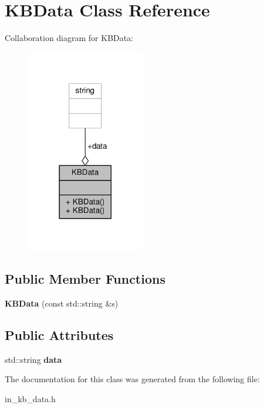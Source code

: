 \hypertarget{classKBData}{}\section{K\+B\+Data Class Reference}
\label{classKBData}


Collaboration diagram for K\+B\+Data\+:
\nopagebreak
\begin{figure}[H]
\begin{center}
\leavevmode
\includegraphics[width=146pt]{d0/d9b/classKBData__coll__graph}
\end{center}
\end{figure}
\subsection*{Public Member Functions}
\begin{DoxyCompactItemize}
\item 
{\bfseries K\+B\+Data} (const std\+::string \&s)\hypertarget{classKBData_a14da020cad9340edf700e625429fb486}{}\label{classKBData_a14da020cad9340edf700e625429fb486}

\end{DoxyCompactItemize}
\subsection*{Public Attributes}
\begin{DoxyCompactItemize}
\item 
std\+::string {\bfseries data}\hypertarget{classKBData_a82f038f48b7bd35567e744ca8ab34fad}{}\label{classKBData_a82f038f48b7bd35567e744ca8ab34fad}

\end{DoxyCompactItemize}


The documentation for this class was generated from the following file\+:\begin{DoxyCompactItemize}
\item 
in\+\_\+kb\+\_\+data.\+h\end{DoxyCompactItemize}
